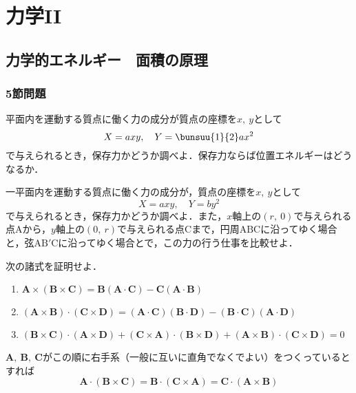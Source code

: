 \chapter{力学II}
\setcounter{page}{1}
\section{力学的エネルギー　面積の原理}
\subsection{5節問題}

\begin{enumerate}[label=\textbf{[\arabic*]}, labelsep=10pt, leftmargin=23pt]
	\item 平面内を運動する質点に働く力の成分が質点の座標を$x,\ y$として
		\begin{equation*}
			X = axy,\quad Y = \bunsuu{1}{2}ax^2
		\end{equation*}
		で与えられるとき，保存力かどうか調べよ．保存力ならば位置エネルギーはどうなるか．
	\item 一平面内を運動する質点に働く力の成分が，質点の座標を$x,\ y$として
		\begin{equation*}
			X = axy,\quad Y = by^2
		\end{equation*}
		で与えられるとき，保存力かどうか調べよ．また，$x$軸上の$(r,\ 0)$で与えられる点$\mathrm{A}$から，$y$軸上の$(0,\ r)$で与えられる点$\mathrm{C}$まで，円周$\mathrm{ABC}$に沿ってゆく場合と，弦$\mathrm{AB'C}$に沿ってゆく場合とで，この力の行う仕事を比較せよ．
	\item 次の諸式を証明せよ．
		\begin{enumerate}[label={(\alph*)}, labelsep=10pt]
			\item $\bm{A} \times (\bm{B} \times \bm{C}) = \bm{B}(\bm{A} \cdot \bm{C}) - \bm{C}(\bm{A} \cdot \bm{B})$
			\item $(\bm{A} \times \bm{B}) \cdot (\bm{C} \times \bm{D}) = (\bm{A} \cdot \bm{C})(\bm{B} \cdot \bm{D}) - (\bm{B} \cdot \bm{C})(\bm{A} \cdot \bm{D})$
			\item $(\bm{B} \times \bm{C})\cdot(\bm{A} \times \bm{D}) + (\bm{C} \times \bm{A}) \cdot (\bm{B} \times \bm{D}) + (\bm{A} \times \bm{B}) \cdot (\bm{C} \times \bm{D}) = 0$
		\end{enumerate}
	\item $\bm{A},\ \bm{B},\ \bm{C}$がこの順に右手系（一般に互いに直角でなくでよい）をつくっているとすれば
		\begin{equation*}
			\bm{A} \cdot (\bm{B} \times \bm{C}) = \bm{B} \cdot (\bm{C} \times \bm{A}) = \bm{C} \cdot (\bm{A} \times \bm{B})

\end{equation*}
\end{enumerate}
